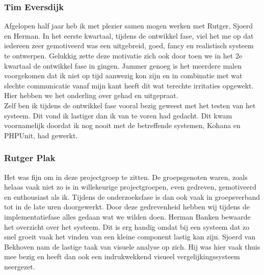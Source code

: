 \documentclass[a4paper,10pt]{article}
\begin{document}
		\subsubsection{Tim Eversdijk}
		Afgelopen half jaar heb ik met plezier samen mogen werken met Rutger, Sjoerd en Herman. In het eerste kwartaal, tijdens de ontwikkel fase, viel het me op dat iedereen zeer gemotiveerd was een uitgebreid, goed, fancy en realistisch systeem te ontwerpen. Gelukkig zette deze motivatie zich ook door toen we in het 2e kwartaal de ontwikkel fase in gingen. Jammer genoeg is het meerdere malen voorgekomen dat ik niet op tijd aanwezig kon zijn en in combinatie met wat slechte communicatie vanaf mijn kant heeft dit wat terechte irritaties opgewekt. Hier hebben we het onderling over gehad en uitgepraat.\\
		Zelf ben ik tijdens de ontwikkel fase vooral bezig geweest met het testen van het systeem. Dit vond ik lastiger dan ik van te voren had gedacht. Dit kwam voornamelijk doordat ik nog nooit met de betreffende systemen, Kohana en PHPUnit, had gewerkt.
		
		\subsubsection{Rutger Plak}
		Het was fijn om in deze projectgroep te zitten. De groepsgenoten waren, zoals helaas vaak niet zo is in willekeurige projectgroepen, even gedreven, gemotiveerd en enthousiast als ik. Tijdens de onderzoeksfase is dan ook vaak in groepsverband tot in de late uren doorgewerkt. Door deze gedrevenheid hebben wij tijdens de implementatiefase alles gedaan wat we wilden doen. Herman Banken bewaarde het overzicht over het systeem. Dit is erg handig omdat bij een systeem dat zo snel groeit vaak het vinden van een kleine component lastig kan zijn. Sjoerd van Bekhoven nam de lastige taak van visuele analyse op zich. Hij was hier vaak thuis mee bezig en heeft dan ook een indrukwekkend visueel vergelijkingssysteem neergezet.
		
\end{document}
